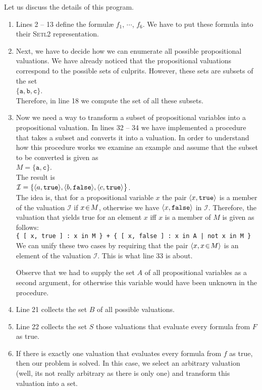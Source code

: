 \noindent
Let us discuss the details of this program.
\begin{enumerate}
\item Lines  2 -- 13 define the {formul\ae}  $f_1$, $\cdots$, $f_6$.
      We have to put these formula into their  \textsc{Setl2} representation.
\item Next, we have to decide how we can enumerate all possible propositional valuations.
      We have already noticed that the propositional valuations correspond to the possible
      sets of culprits.  However, these sets are subsets of the set
      \\[0.2cm]
      \hspace*{1.3cm} $\{ \mathtt{a}, \mathtt{b}, \mathtt{c} \}$. \\[0.2cm]
      Therefore, in line 18 we compute the set of all these subsets.
\item Now we need a way to transform a subset of propositional variables into a
      propositional valuation. In lines 32 -- 34 we have implemented a procedure
      that takes a subset and converts it into a valuation.
      In order to understand how this procedure works we examine an example and assume
      that the subset to be converted is given as \\[0.2cm]
      \hspace*{1.3cm} $M = \{\mathtt{a}, \mathtt{c} \}$. \\[0.2cm]
      The result is \\[0.2cm]
      \hspace*{1.3cm} 
      $\mathcal{I} = \{ \pair(a,\mathtt{true}), \pair(b,\mathtt{false}),\pair(c,\mathtt{true}) \bigr\}$. 
      \\[0.2cm]
      The idea is, that for a propositional variable
      $x$ the pair $\pair(x,\mathtt{true})$ is a member of the valuation $\mathcal{I}$
      if $x \!\in\! M$, otherwise we have $\pair(x,\mathtt{false})$ in $\mathcal{I}$.  
      Therefore, the valuation that yields true for an element $x$ iff $x$ is a member of $M$ 
      is given as follows:
      \\[0.2cm]
      \hspace*{1.3cm}      
      \texttt{\{ [ x, true ] : x in M \} + \{ [ x, false ] : x in A | not x in M \}}
      \\[0.2cm]
      We can unify these two cases by requiring that the pair $\pair(x, x \el M)$ is an
      element of the valuation $\mathcal{I}$.  This is what line 33 is about.

      Observe that we had to supply the set $A$ of all propositional variables as a second
      argument, for otherwise this variable would have been unknown in the procedure.
\item Line 21 collects the set $B$ of all possible valuations.
\item Line 22 collects the set $S$ those valuations that evaluate every formula from $F$ as true.
\item If there is exactly one valuation that evaluates every formula from $f$ as true,
      then our problem is solved.  In this case, we select an arbitrary valuation 
      (well, its not really arbitrary as there is only one) and transform this valuation
      into a set.
\end{enumerate}
